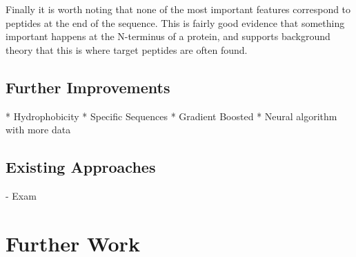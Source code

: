 \documentclass{bioinfo}
\begin{document}
Finally it is worth noting that none of the most important features correspond to peptides at the end of the sequence.  This is fairly good evidence that something important happens at the N-terminus of a protein, and  supports background theory that this is where target peptides are often found.


\subsection{Further Improvements}

* Hydrophobicity
* Specific Sequences
* Gradient Boosted
* Neural algorithm with more data










  




\subsection{Existing Approaches}
   - Exam


\section{Further Work}
\end{document}
